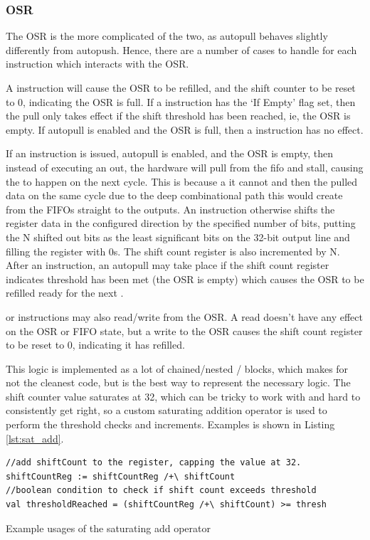 \subsubsection{OSR}

The OSR is the more complicated of the two, as autopull behaves slightly differently from autopush. Hence, there are a number of cases to handle for each instruction which interacts with the OSR.

A  instruction will cause the OSR to be refilled, and the shift counter to be reset to 0, indicating the OSR is full. If a  instruction has the `If Empty' flag set, then the pull only takes effect if the shift threshold has been reached, ie, the OSR is empty. If autopull is enabled and the OSR is full, then a  instruction has no effect.

If an  instruction is issued, autopull is enabled, and the OSR is empty, then instead of executing an out, the hardware will pull from the fifo and stall, causing the  to happen on the next cycle. This is because a it cannot  and then  the pulled data on the same cycle due to the deep combinational path this would create from the FIFOs straight to the outputs. An  instruction otherwise shifts the register data in the configured direction by the specified number of bits, putting the N shifted out bits as the least significant bits on the 32-bit output line and filling the register with 0s. The shift count register is also incremented by N. After an  instruction, an autopull may take place if the shift count register indicates threshold has been met (the OSR is empty) which causes the OSR to be refilled ready for the next .

 or  instructions may also read/write from the OSR. A read doesn't have any effect on the OSR or FIFO state, but a write to the OSR causes the shift count register to be reset to 0, indicating it has refilled.

This logic is implemented as a lot of chained/nested / blocks, which makes for not the cleanest code, but is the best way to represent the necessary logic. The shift counter value saturates at 32, which can be tricky to work with and hard to consistently get right, so a custom saturating addition operator \txt{+!} is used to perform the threshold checks and increments. Examples is shown in Listing \ref{lst:sat_add}.


\begin{listing}[h!]
    \vspace{0.5cm}
    \begin{verbatim}
//add shiftCount to the register, capping the value at 32.
shiftCountReg := shiftCountReg /+\ shiftCount
//boolean condition to check if shift count exceeds threshold
val thresholdReached = (shiftCountReg /+\ shiftCount) >= thresh
    \end{verbatim}
    \caption{Example usages of the saturating add operator}
    \label{lst:sat_add}
\end{listing}


